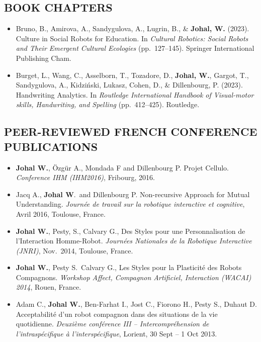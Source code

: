 \subsection{BOOK CHAPTERS}
\vspace{2pt}

\begin{itemize}[nosep]
    \renewcommand\labelitemi{$\bullet$}
    \item Bruno, B., Amirova, A., Sandygulova, A., Lugrin, B., \& \textbf{Johal, W.} (2023). Culture in Social Robots for Education. In \textit{Cultural Robotics: Social Robots and Their Emergent Cultural Ecologies} (pp.\ 127--145). Springer International Publishing Cham.

    \item Burget, L., Wang, C., Asselborn, T., Tozadore, D., \textbf{Johal, W.}, Gargot, T., Sandygulova, A., Kidziński, Lukasz, Cohen, D., \& Dillenbourg, P. (2023). Handwriting Analytics. In \textit{Routledge International Handbook of Visual-motor skills, Handwriting, and Spelling} (pp.\ 412--425). Routledge.
\end{itemize}

\vspace{0.1in}

\subsection{PEER-REVIEWED FRENCH CONFERENCE PUBLICATIONS}
\vspace{2pt}

\begin{itemize}[nosep]
    \renewcommand\labelitemi{$\bullet$}
    \item \textbf{Johal W.}, Özgür A., Mondada F and Dillenbourg P. Projet Cellulo. \textit{Conference IHM (IHM2016)}, Fribourg, 2016.

    \item Jacq A., \textbf{Johal W}.\ and Dillenbourg P. Non-recursive Approach for Mutual Understanding. \textit{Journée de travail sur la robotique interactive et cognitive}, Avril 2016, Toulouse, France.

    \item \textbf{Johal W.}, Pesty, S., Calvary G., Des Styles pour une Personnalisation de l'Interaction Homme-Robot. \textit{Journées Nationales de la Robotique Interactive (JNRI)}, Nov.\ 2014, Toulouse, France.

    \item \textbf{Johal W.}, Pesty S.\ Calvary G., Les Styles pour la Plasticité des Robots Compagnons. \textit{Workshop Affect, Compagnon Artificiel, Interaction (WACAI) 2014}, Rouen, France.

    \item Adam C., \textbf{Johal W.}, Ben-Farhat I., Jost C., Fiorono H., Pesty S., Duhaut D. Acceptabilité d'un robot compagnon dans des situations de la vie quotidienne. \textit{Deuxième conférence III -- Intercompréhension de l'intraspécifique à l'interspécifique}, Lorient, 30 Sept -- 1 Oct 2013.
\end{itemize}

